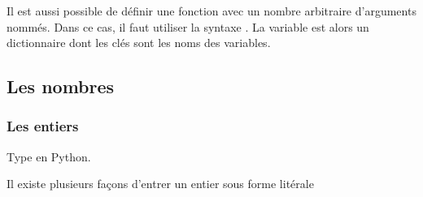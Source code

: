 \documentclass[letterpaper,10pt,english]{sphinxhowto}
\begin{document}
\sphinxAtStartPar
Il est aussi possible de définir une fonction avec un nombre arbitraire d’arguments nommés. Dans ce cas, il faut utiliser la syntaxe . La variable  est alors un dictionnaire dont les clés sont les noms des variables.

\begin{sphinxVerbatim}[commandchars=\\\{\}]
   
     
     
     
    
   
\end{sphinxVerbatim}


\subsection{Les nombres}
\label{\detokenize{cours2_nombres_cours:les-nombres}}\label{\detokenize{cours2_nombres_cours::doc}}

\subsubsection{Les entiers}
\label{\detokenize{cours2_nombres_cours:les-entiers}}
\sphinxAtStartPar
Type  en Python.

\sphinxAtStartPar
Il existe plusieurs façons d’entrer un entier sous forme litérale

\begin{sphinxVerbatim}[commandchars=\\\{\}]
   
   
   
\end{sphinxVerbatim}
\end{document}
